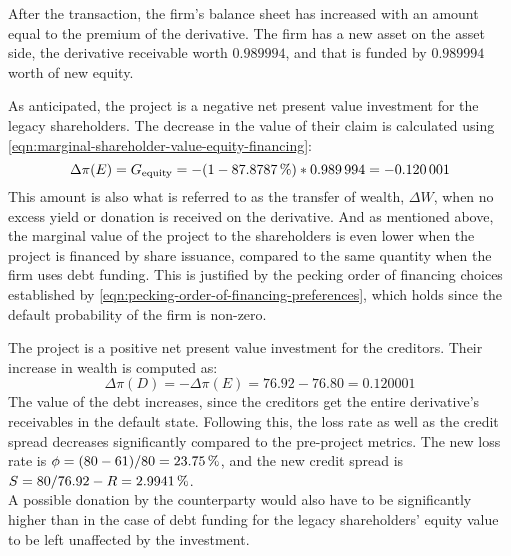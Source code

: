 \documentclass[main.tex]{subfiles}
\begin{document}
        After the transaction, the firm's balance sheet has increased with an amount equal to the premium of the derivative. 
        The firm has a new asset on the asset side, the derivative receivable worth $\num{0.989994}$, and that is funded by $\num{0.989994}$ worth of new equity.

        As anticipated,
        the project is a negative net present value investment for the legacy shareholders. 
        The decrease in the value of their claim is calculated using
        \cref{eqn:marginal-shareholder-value-equity-financing}:
        \begin{equation}
                \Delta \pi(E) 
            =  
                G_{\text{equity}}
            =
                - (\num{1} - \pct{0.878787}) * \num{0.989994}
            = 
                -\num{0.120001}
        \end{equation}
        This amount is also what is referred to as the transfer of wealth, $\Delta W$, when no excess yield or donation is received on the derivative. 
        And as mentioned above, the marginal value of the project to the shareholders is even lower when the project is financed by share issuance,
        compared to the same quantity when the firm uses debt funding.
        This is justified by the pecking order of financing choices established by
        \cref{eqn:pecking-order-of-financing-preferences}, 
        which holds since the default probability of the firm is non-zero.

        The project is a positive net present value investment for the creditors. 
        Their increase in wealth is computed as:
        \begin{equation}\label{eqn:wealth-transfer-equality}
            \Delta \pi(D) = -\Delta \pi(E) = \num{76.92} - \num{76.80} = \num{0.120001}
        \end{equation}
        The value of the debt increases, since the creditors get the entire derivative's receivables in the default state. Following this, the loss rate as well as the credit spread decreases significantly compared to the pre-project metrics. The new loss rate is $\phi = (\num{80}-\num{61})/\num{80} = \pct{0.2375}$, and the new credit spread is $S = \num{80}/\num{76.92} - \grossrfrate = \pct{0.029941}$.
        \\
        A possible donation by the counterparty would also have to be significantly higher than in the case of debt funding for the legacy shareholders' equity value to be left unaffected by the investment. 
\end{document}
